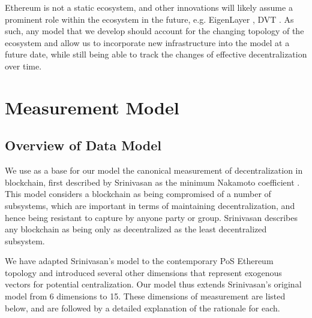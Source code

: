 \documentclass[conference]{IEEEtran}
\begin{document}
Ethereum is not a static ecosystem, and other innovations will likely assume a prominent role within the ecosystem in the future, e.g. EigenLayer \cite{eigenlayer2023}, DVT \cite{asgaonkar-2021}.  As such, any model that we develop should account for the changing topology of the ecosystem and allow us to incorporate new infrastructure into the model at a future date, while still being able to track the changes of effective decentralization over time.

\section{Measurement Model}

\subsection{Overview of Data Model}

We use as a base for our model the canonical measurement of decentralization in blockchain, first described by Srinivasan as the minimum Nakamoto coefficient \cite{srinivasan2018}.  This model considers a blockchain as being compromised of a number of subsystems, which are important in terms of maintaining decentralization, and hence being resistant to capture by anyone party or group.  Srinivasan describes any blockchain as being only as decentralized as the least decentralized subsystem. 

We have adapted Srinivasan's model to the contemporary PoS Ethereum topology and introduced several other dimensions that represent exogenous vectors for potential centralization.  Our model thus extends Srinivasan's original model from 6 dimensions to 15.  These dimensions of measurement are listed below, and are followed by a detailed explanation of the rationale for each.
\end{document}
